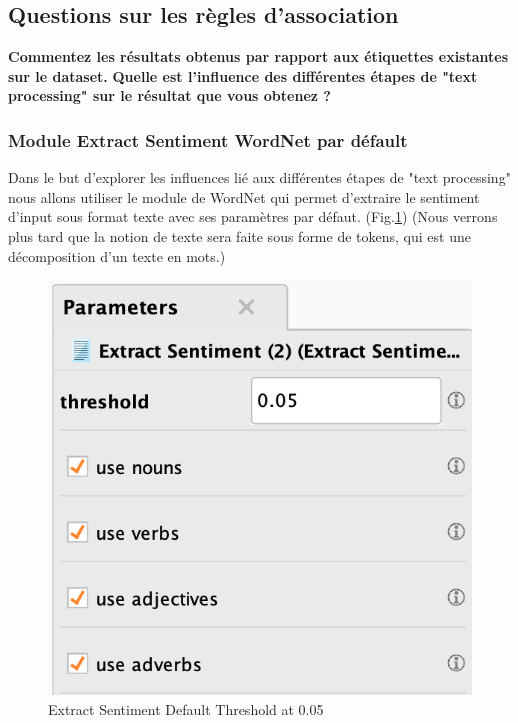 \documentclass[a4paper]{article}
\begin{document}
\subsection{Questions sur les règles d'association}

\textbf{Commentez les résultats obtenus par rapport aux étiquettes existantes sur le dataset.}
\textbf{Quelle est l'influence des différentes étapes de "text processing" sur le résultat que vous obtenez ?}

\subsubsection{Module Extract Sentiment WordNet par défault}
Dans le but d'explorer les influences lié aux différentes étapes de "text processing" nous allons utiliser le module de WordNet qui permet d'extraire le sentiment d'input sous format texte avec ses paramètres par défaut. (Fig.\ref{fig:3_processing_documents_full_0_05}) (Nous verrons plus tard que la notion de texte sera faite sous forme de tokens, qui est une décomposition d'un texte en mots.)
\begin{figure}[H]
\centering
	\includegraphics[width=\linewidth/3]{imgs/part_3/3_processing_documents_full_0_05}
	\caption{Extract Sentiment Default Threshold at 0.05}
	\label{fig:3_processing_documents_full_0_05}
\end{figure}
\end{document}
